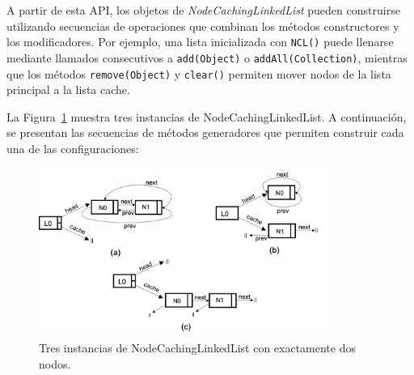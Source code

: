 \noindent
A partir de esta API, los objetos de \emph{NodeCachingLinkedList} pueden
construirse utilizando secuencias de operaciones que combinan los métodos
constructores y los modificadores. Por ejemplo, una lista inicializada con
\texttt{NCL()} puede llenarse mediante llamados consecutivos a
\texttt{add(Object)} o \texttt{addAll(Collection)}, mientras que los métodos
\texttt{remove(Object)} y \texttt{clear()} permiten mover nodos de la lista
principal a la lista cache.

La Figura~\ref{fig:ncl-instances-intro} muestra tres instancias de NodeCachingLinkedList. A continuación, se presentan las secuencias de métodos generadores que permiten construir cada una de las configuraciones:

\begin{figure}[H]
    \centering
    \includegraphics[width=0.85\textwidth]{images/NCL-instances.png}
    \caption{Tres instancias de NodeCachingLinkedList con exactamente dos nodos.}
    \label{fig:ncl-instances-intro}
\end{figure}

